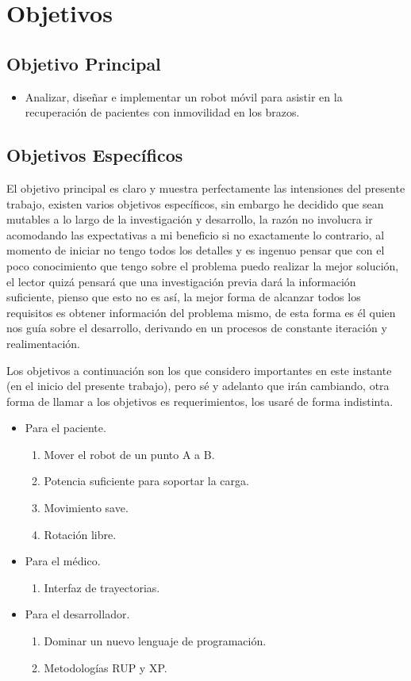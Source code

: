 \chapter{Objetivos} \label{objetivos}
\section{Objetivo Principal}
\begin{itemize}
	\item Analizar, diseñar e implementar un robot móvil para asistir en la 
		recuperación de pacientes con inmovilidad en los brazos.
\end{itemize}
\section{Objetivos Específicos}
El objetivo principal es claro y muestra perfectamente las intensiones del presente
trabajo, existen varios objetivos específicos, sin embargo he decidido que 
sean mutables a lo largo de la investigación y desarrollo,
la razón no involucra ir acomodando las expectativas a mi beneficio si no 
exactamente lo contrario, al momento de iniciar no tengo todos los detalles y es
ingenuo pensar que con el poco conocimiento que tengo sobre el problema puedo 
realizar la mejor solución, el lector quizá pensará que una investigación 
previa dará la información suficiente, pienso que esto no 
es así, la mejor forma de alcanzar todos los requisitos es obtener información del
problema mismo, de esta forma es él quien nos guía sobre el desarrollo,
derivando en un procesos de
constante iteración y realimentación.

Los objetivos a continuación son los que considero importantes en este instante 
(en el inicio del presente trabajo), pero sé y adelanto que irán cambiando, otra
forma de llamar a los objetivos es requerimientos, los usaré de forma indistinta.
\begin{itemize}
	\item Para el paciente.
		\begin{enumerate}
			\item Mover el robot de un punto A a B.
			\item Potencia suficiente para soportar la carga.
			\item Movimiento save.
			\item Rotación libre.
		\end{enumerate}
	\item Para el médico.
		\begin{enumerate}
			\item Interfaz de trayectorias.
		\end{enumerate}
	\item Para el desarrollador.
		\begin{enumerate}
			\item Dominar un nuevo lenguaje de programación.
			\item Metodologías RUP y XP.
		\end{enumerate}
\end{itemize}
